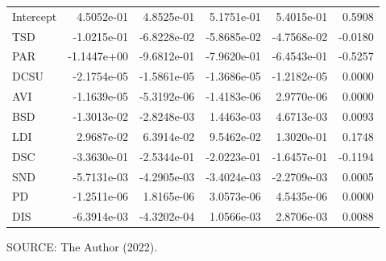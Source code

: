 \begin{table}[!htbp]
\begin{tabular}{lrrrrr}
        Intercept & 4.5052e-01 & 4.8525e-01 & 5.1751e-01 & 5.4015e-01 & 0.5908 \\
        TSD       & -1.0215e-01 & -6.8228e-02 & -5.8685e-02 & -4.7568e-02 & -0.0180 \\
        PAR       & -1.1447e+00 & -9.6812e-01 & -7.9620e-01 & -6.4543e-01 & -0.5257 \\
        DCSU      & -2.1754e-05 & -1.5861e-05 & -1.3686e-05 & -1.2182e-05 & 0.0000 \\
        AVI       & -1.1639e-05 & -5.3192e-06 & -1.4183e-06 & 2.9770e-06 & 0.0000 \\
        BSD       & -1.3013e-02 & -2.8248e-03 & 1.4463e-03 & 4.6713e-03 & 0.0093 \\
        LDI       & 2.9687e-02 & 6.3914e-02 & 9.5462e-02 & 1.3020e-01 & 0.1748 \\
        DSC       & -3.3630e-01 & -2.5344e-01 & -2.0223e-01 & -1.6457e-01 & -0.1194 \\
        SND       & -5.7131e-03 & -4.2905e-03 & -3.4024e-03 & -2.2709e-03 & 0.0005 \\
        PD        & -1.2511e-06 & 1.8165e-06 & 3.0573e-06 & 4.5435e-06 & 0.0000 \\
        DIS       & -6.3914e-03 & -4.3202e-04 & 1.0566e-03 & 2.8706e-03 & 0.0088 \\
        \hline
    \end{tabular}
    \label{tab:gwr_results}
    \par \vspace{2mm} \footnotesize \raggedright
    SOURCE: The Author (2022).
\end{table}


